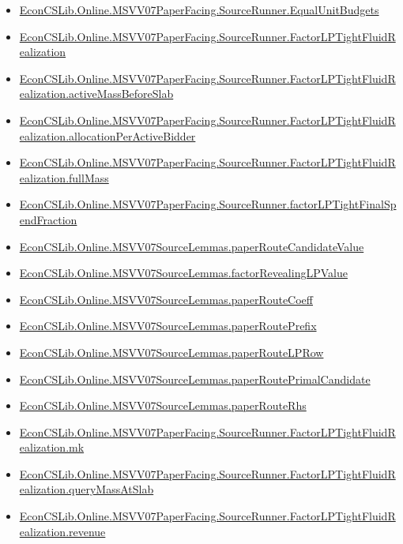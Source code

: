 \documentclass[10pt]{article}
\begin{document}
\begin{itemize}[leftmargin=1.2em]
\begin{itemize}[leftmargin=1.2em]
\item \hyperlink{library-prerequisite-e5fdce9997e2ba1d}{EconCSLib.Online.MSVV07PaperFacing.SourceRunner.EqualUnitBudgets}
\item \hyperlink{library-prerequisite-c12f61280e005238}{EconCSLib.Online.MSVV07PaperFacing.SourceRunner.FactorLPTightFluidRealization}
\item \hyperlink{library-prerequisite-3754034fd2329148}{EconCSLib.Online.MSVV07PaperFacing.SourceRunner.FactorLPTightFluidRealization.activeMassBeforeSlab}
\item \hyperlink{library-prerequisite-cf8f3b1754e01401}{EconCSLib.Online.MSVV07PaperFacing.SourceRunner.FactorLPTightFluidRealization.allocationPerActiveBidder}
\item \hyperlink{library-prerequisite-273e7a55b1c08532}{EconCSLib.Online.MSVV07PaperFacing.SourceRunner.FactorLPTightFluidRealization.fullMass}
\item \hyperlink{library-prerequisite-ed7331e73124a3b4}{EconCSLib.Online.MSVV07PaperFacing.SourceRunner.factorLPTightFinalSpendFraction}
\item \hyperlink{library-prerequisite-9377a5bb30b6077d}{EconCSLib.Online.MSVV07SourceLemmas.paperRouteCandidateValue}
\item \hyperlink{library-prerequisite-6bab95319f4fb76c}{EconCSLib.Online.MSVV07SourceLemmas.factorRevealingLPValue}
\item \hyperlink{library-prerequisite-8b4960ddbee0a2f6}{EconCSLib.Online.MSVV07SourceLemmas.paperRouteCoeff}
\item \hyperlink{library-prerequisite-e9dc2ff381e0e441}{EconCSLib.Online.MSVV07SourceLemmas.paperRoutePrefix}
\item \hyperlink{library-prerequisite-71cb7847d02b1d3b}{EconCSLib.Online.MSVV07SourceLemmas.paperRouteLPRow}
\item \hyperlink{library-prerequisite-a83fda89512a5ee8}{EconCSLib.Online.MSVV07SourceLemmas.paperRoutePrimalCandidate}
\item \hyperlink{library-prerequisite-e0fa1f0f101b3d7c}{EconCSLib.Online.MSVV07SourceLemmas.paperRouteRhs}
\item \hyperlink{library-prerequisite-6485cb61d60e410c}{EconCSLib.Online.MSVV07PaperFacing.SourceRunner.FactorLPTightFluidRealization.mk}
\item \hyperlink{library-prerequisite-41fe4cf987e30ec5}{EconCSLib.Online.MSVV07PaperFacing.SourceRunner.FactorLPTightFluidRealization.queryMassAtSlab}
\item \hyperlink{library-prerequisite-43cf44516b04a7bd}{EconCSLib.Online.MSVV07PaperFacing.SourceRunner.FactorLPTightFluidRealization.revenue}

\end{itemize}
\end{itemize}
\end{document}
